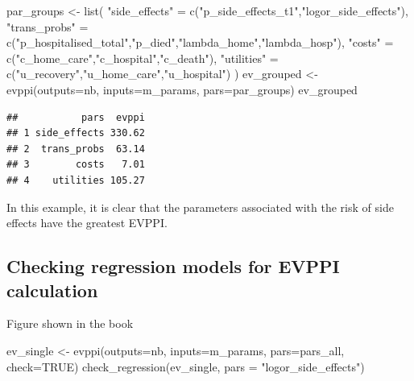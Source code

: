 \documentclass[
]{article}
\newenvironment{Shaded}{\begin{snugshade}}{\end{snugshade}}
\newcommand{\AttributeTok}[1]{\textcolor[rgb]{0.77,0.63,0.00}{#1}}
\newcommand{\ConstantTok}[1]{\textcolor[rgb]{0.00,0.00,0.00}{#1}}
\newcommand{\FunctionTok}[1]{\textcolor[rgb]{0.00,0.00,0.00}{#1}}
\newcommand{\NormalTok}[1]{#1}
\newcommand{\OtherTok}[1]{\textcolor[rgb]{0.56,0.35,0.01}{#1}}
\newcommand{\StringTok}[1]{\textcolor[rgb]{0.31,0.60,0.02}{#1}}
\begin{document}
\begin{Shaded}
\begin{Highlighting}[]
\NormalTok{par\_groups }\OtherTok{\textless{}{-}} \FunctionTok{list}\NormalTok{(}
  \StringTok{"side\_effects"} \OtherTok{=} \FunctionTok{c}\NormalTok{(}\StringTok{"p\_side\_effects\_t1"}\NormalTok{,}\StringTok{"logor\_side\_effects"}\NormalTok{),}
  \StringTok{"trans\_probs"} \OtherTok{=} \FunctionTok{c}\NormalTok{(}\StringTok{"p\_hospitalised\_total"}\NormalTok{,}\StringTok{"p\_died"}\NormalTok{,}\StringTok{"lambda\_home"}\NormalTok{,}\StringTok{"lambda\_hosp"}\NormalTok{),}
  \StringTok{"costs"} \OtherTok{=} \FunctionTok{c}\NormalTok{(}\StringTok{"c\_home\_care"}\NormalTok{,}\StringTok{"c\_hospital"}\NormalTok{,}\StringTok{"c\_death"}\NormalTok{),}
  \StringTok{"utilities"} \OtherTok{=} \FunctionTok{c}\NormalTok{(}\StringTok{"u\_recovery"}\NormalTok{,}\StringTok{"u\_home\_care"}\NormalTok{,}\StringTok{"u\_hospital"}\NormalTok{)}
\NormalTok{)}
\NormalTok{ev\_grouped }\OtherTok{\textless{}{-}} \FunctionTok{evppi}\NormalTok{(}\AttributeTok{outputs=}\NormalTok{nb, }\AttributeTok{inputs=}\NormalTok{m\_params, }\AttributeTok{pars=}\NormalTok{par\_groups)}
\NormalTok{ev\_grouped}
\end{Highlighting}
\end{Shaded}

\begin{verbatim}
##           pars  evppi
## 1 side_effects 330.62
## 2  trans_probs  63.14
## 3        costs   7.01
## 4    utilities 105.27
\end{verbatim}

In this example, it is clear that the parameters associated with the
risk of side effects have the greatest EVPPI.

\hypertarget{checking-regression-models-for-evppi-calculation}{%
\subsection{Checking regression models for EVPPI
calculation}\label{checking-regression-models-for-evppi-calculation}}

Figure shown in the book

\begin{Shaded}
\begin{Highlighting}[]
\NormalTok{ev\_single }\OtherTok{\textless{}{-}} \FunctionTok{evppi}\NormalTok{(}\AttributeTok{outputs=}\NormalTok{nb, }\AttributeTok{inputs=}\NormalTok{m\_params, }\AttributeTok{pars=}\NormalTok{pars\_all, }\AttributeTok{check=}\ConstantTok{TRUE}\NormalTok{)}
\FunctionTok{check\_regression}\NormalTok{(ev\_single, }\AttributeTok{pars =} \StringTok{"logor\_side\_effects"}\NormalTok{)}
\end{Highlighting}
\end{Shaded}
\end{document}
